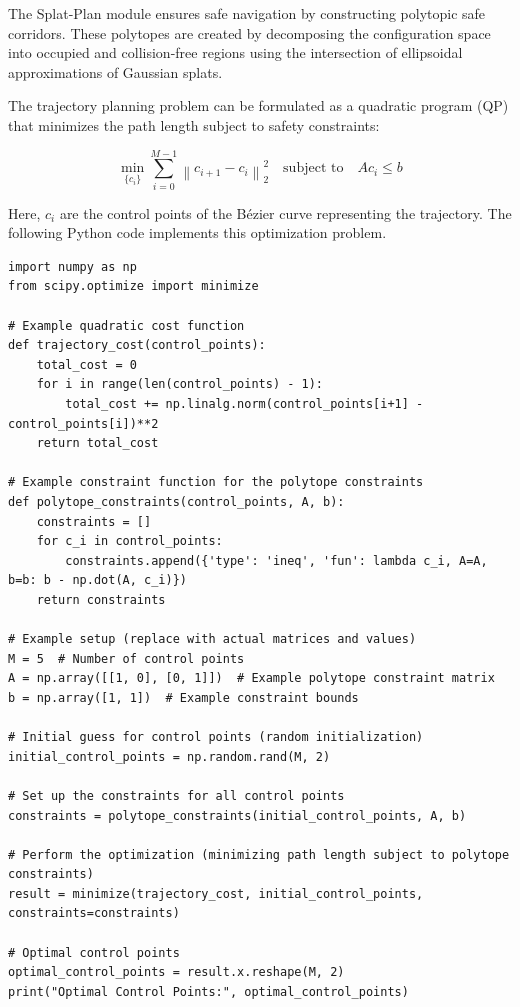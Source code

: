 \begin{enumerate}
            The Splat-Plan module ensures safe navigation by constructing polytopic safe
            corridors. These polytopes are created by decomposing the configuration space
            into occupied and collision-free regions using the intersection of ellipsoidal
            approximations of Gaussian splats.

            The trajectory planning problem can be formulated as a quadratic program (QP)
            that minimizes the path length subject to safety constraints:

            \[
                  \min_{\{c_i\}} \sum_{i=0}^{M-1} \left\| c_{i+1} - c_i \right\|^2_2 \quad \text{subject to} \quad A c_i \leq b
            \]

            Here, \( c_i \) are the control points of the Bézier curve representing the
            trajectory. The following Python code implements this optimization problem.

            \begin{lstlisting}
import numpy as np
from scipy.optimize import minimize

# Example quadratic cost function
def trajectory_cost(control_points):
    total_cost = 0
    for i in range(len(control_points) - 1):
        total_cost += np.linalg.norm(control_points[i+1] - control_points[i])**2
    return total_cost

# Example constraint function for the polytope constraints
def polytope_constraints(control_points, A, b):
    constraints = []
    for c_i in control_points:
        constraints.append({'type': 'ineq', 'fun': lambda c_i, A=A, b=b: b - np.dot(A, c_i)})
    return constraints

# Example setup (replace with actual matrices and values)
M = 5  # Number of control points
A = np.array([[1, 0], [0, 1]])  # Example polytope constraint matrix
b = np.array([1, 1])  # Example constraint bounds

# Initial guess for control points (random initialization)
initial_control_points = np.random.rand(M, 2)

# Set up the constraints for all control points
constraints = polytope_constraints(initial_control_points, A, b)

# Perform the optimization (minimizing path length subject to polytope constraints)
result = minimize(trajectory_cost, initial_control_points, constraints=constraints)

# Optimal control points
optimal_control_points = result.x.reshape(M, 2)
print("Optimal Control Points:", optimal_control_points)
\end{lstlisting}


\end{enumerate}
